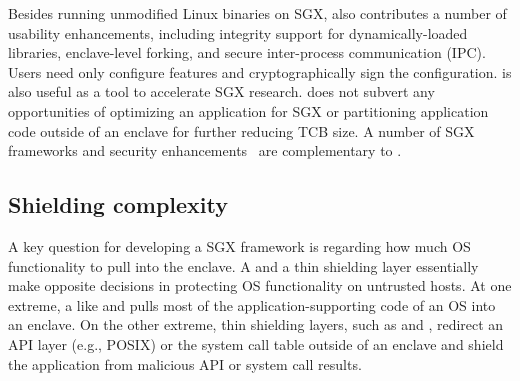 Besides running unmodified Linux binaries on SGX, \graphenesgx{} also contributes a number of usability enhancements,
including integrity support for dynamically-loaded libraries, enclave-level forking, and secure inter-process communication (IPC).
Users need only configure features and cryptographically sign the configuration.
\graphenesgx{} is also useful as a tool to accelerate SGX research.
\graphenesgx{} does not subvert
any opportunities of optimizing an application for SGX or partitioning application code outside of an enclave for further reducing TCB size.
A number of SGX frameworks and security enhancements~\cite{orenbach17eleos,kuvaiskii17sgxbound,shih2017t-sgx,seo2017sgx-shield} are complementary to \graphenesgx{}. 



\subsection{Shielding complexity}
\label{sec:sgx:background:shielding}


A key question for developing a SGX framework is regarding how much OS functionality to pull into the enclave.
A \libos{} and a thin shielding layer essentially make opposite decisions
in protecting OS functionality on untrusted hosts.
At one extreme, a \libos{} like \graphenesgx{} and \haven{} pulls most
of the application-supporting code of an OS into an enclave.
On the other extreme, thin shielding layers, such as \scone{} and \panoply{}, redirect
an API layer (e.g., POSIX) or the system call table
outside of an enclave and shield the application from malicious API or system call results.



